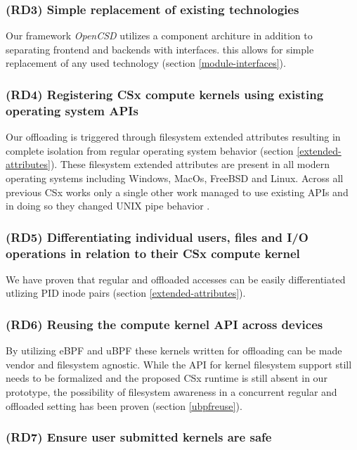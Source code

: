 \subsubsection*{(RD3) Simple replacement of existing technologies}

Our framework \textit{OpenCSD} utilizes a component architure in addition to
separating frontend and backends with interfaces. this allows for simple
replacement of any used technology (section \ref{module-interfaces}).

\subsubsection*{(RD4) Registering CSx compute kernels using existing operating
system APIs}

Our offloading is triggered through filesystem extended attributes
resulting in complete isolation from regular operating system behavior
(section \ref{extended-attributes}). These filesystem extended attributes are
present in all modern operating systems including Windows, MacOs,
FreeBSD and Linux. Across all previous CSx works only a single other
work managed to use existing APIs and in doing so they changed UNIX pipe
behavior \cite{10.1145/3342195.3387557}.

\subsubsection*{(RD5) Differentiating individual users, files and I/O operations in
relation to their CSx compute kernel}

We have proven that regular and offloaded accesses can be easily differentiated
utlizing PID inode pairs (section \ref{extended-attributes}).

\subsubsection*{(RD6) Reusing the compute kernel API across devices}

By utilizing eBPF and uBPF these kernels written for offloading can be made
vendor and filesystem agnostic. While the API for kernel filesystem support
still needs to be formalized and the proposed CSx runtime is still absent in our
prototype, the possibility of filesystem awareness in a concurrent regular and
offloaded setting has been proven (section \ref{ubpfreuse}).

\subsubsection*{(RD7) Ensure user submitted kernels are safe}

